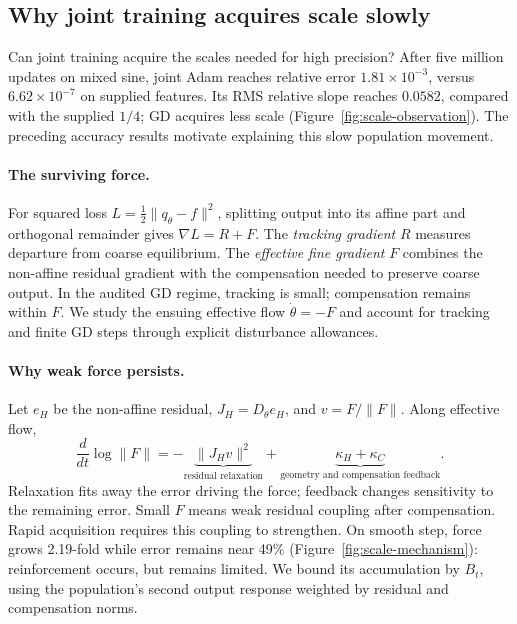 \subsection{Why joint training acquires scale slowly}
\label{sec:scale-acquisition}

Can joint training acquire the scales needed for high precision?
After five million updates on mixed sine, joint Adam reaches relative error
$1.81\times10^{-3}$, versus $6.62\times10^{-7}$ on supplied features.
Its RMS relative slope reaches $0.0582$, compared with the supplied $1/4$;
GD acquires less scale (Figure~\ref{fig:scale-observation}). The preceding
accuracy results motivate explaining this slow population movement.

\paragraph{The surviving force.}
For squared loss $L=\frac12\|q_\theta-f\|^2$, splitting output into its
affine part and orthogonal remainder gives $\nabla L=R+F$. The
\emph{tracking gradient} $R$ measures departure from coarse equilibrium.
The \emph{effective fine gradient} $F$ combines the non-affine residual
gradient with the compensation needed to preserve coarse output.
In the audited GD regime, tracking is small; compensation remains within $F$.
We study the ensuing effective flow $\dot\theta=-F$ and account for
tracking and finite GD steps through explicit disturbance allowances.

\paragraph{Why weak force persists.}
Let $e_H$ be the non-affine residual, $J_H=D_\theta e_H$, and
$v=F/\|F\|$. Along effective flow,
\begin{equation}
\frac{d}{dt}\log\|F\|
=-\underbrace{\|J_Hv\|^2}_{\text{residual relaxation}}
+\underbrace{\kappa_H+\kappa_C}_{\text{geometry and compensation feedback}}.
\label{eq:scale-force-identity}
\end{equation}
Relaxation fits away the error driving the force; feedback changes
sensitivity to the remaining error. Small $F$ means weak residual coupling
after compensation. Rapid acquisition requires this coupling to strengthen.
On smooth step, force grows 2.19-fold while error remains near 49\%
(Figure~\ref{fig:scale-mechanism}): reinforcement occurs, but remains limited.
We bound its accumulation by $B_t$, using the population's second output
response weighted by residual and compensation norms.

